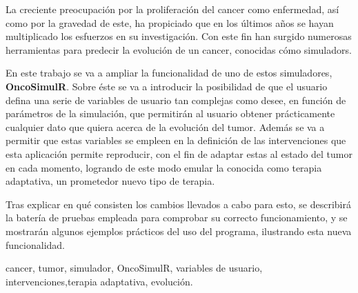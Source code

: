 \begin{abstractEs}
La creciente preocupación por la proliferación del \gls{cancer} como enfermedad, así como por la gravedad de este, ha propiciado que en los últimos años se hayan multiplicado los esfuerzos en su investigación. Con este fin han surgido numerosas herramientas para predecir la evolución de un \gls{cancer}, conocidas cómo \glspl{simulador}.

En este trabajo se va a ampliar la funcionalidad de uno de estos simuladores, \textbf{OncoSimulR}. Sobre éste se va a introducir la posibilidad de que el usuario defina una serie de variables de usuario tan complejas como desee, en función de parámetros de la simulación, que permitirán al usuario obtener prácticamente cualquier dato que quiera acerca de la evolución del \gls{tumor}. Además se va a permitir que estas variables se empleen en la definición de las intervenciones que esta aplicación permite reproducir, con el fin de adaptar estas al estado del \gls{tumor} en cada momento, logrando de este modo emular la conocida como terapia adaptativa, un prometedor nuevo tipo de terapia.

Tras explicar en qué consisten los cambios llevados a cabo para esto, se describirá la batería de pruebas empleada para comprobar su correcto funcionamiento, y se mostrarán algunos ejemplos prácticos del uso del programa, ilustrando esta nueva funcionalidad.
\end{abstractEs}

\begin{keywordsEs}
\Gls{cancer}, \gls{tumor}, \gls{simulador}, OncoSimulR, variables de usuario, intervenciones,terapia adaptativa, evolución.
\end{keywordsEs}
